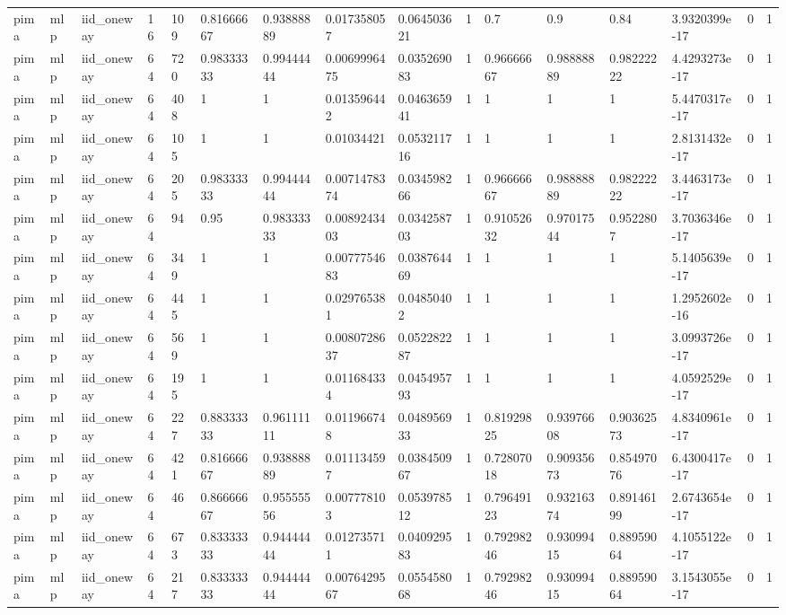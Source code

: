 \begin{tabular}{llllllllllllllll}
pima & mlp & iid\_oneway & 16 & 109 & 0.81666667 & 0.93888889 & 0.017358057 & 0.064503621 & 1 & 0.7 & 0.9 & 0.84 & 3.9320399e-17 & 0 & 1 \\
pima & mlp & iid\_oneway & 64 & 720 & 0.98333333 & 0.99444444 & 0.0069996475 & 0.035269083 & 1 & 0.96666667 & 0.98888889 & 0.98222222 & 4.4293273e-17 & 0 & 1 \\
pima & mlp & iid\_oneway & 64 & 408 & 1 & 1 & 0.013596442 & 0.046365941 & 1 & 1 & 1 & 1 & 5.4470317e-17 & 0 & 1 \\
pima & mlp & iid\_oneway & 64 & 105 & 1 & 1 & 0.01034421 & 0.053211716 & 1 & 1 & 1 & 1 & 2.8131432e-17 & 0 & 1 \\
pima & mlp & iid\_oneway & 64 & 205 & 0.98333333 & 0.99444444 & 0.0071478374 & 0.034598266 & 1 & 0.96666667 & 0.98888889 & 0.98222222 & 3.4463173e-17 & 0 & 1 \\
pima & mlp & iid\_oneway & 64 & 94 & 0.95 & 0.98333333 & 0.0089243403 & 0.034258703 & 1 & 0.91052632 & 0.97017544 & 0.9522807 & 3.7036346e-17 & 0 & 1 \\
pima & mlp & iid\_oneway & 64 & 349 & 1 & 1 & 0.0077754683 & 0.038764469 & 1 & 1 & 1 & 1 & 5.1405639e-17 & 0 & 1 \\
pima & mlp & iid\_oneway & 64 & 445 & 1 & 1 & 0.029765381 & 0.04850402 & 1 & 1 & 1 & 1 & 1.2952602e-16 & 0 & 1 \\
pima & mlp & iid\_oneway & 64 & 569 & 1 & 1 & 0.0080728637 & 0.052282287 & 1 & 1 & 1 & 1 & 3.0993726e-17 & 0 & 1 \\
pima & mlp & iid\_oneway & 64 & 195 & 1 & 1 & 0.011684334 & 0.045495793 & 1 & 1 & 1 & 1 & 4.0592529e-17 & 0 & 1 \\
pima & mlp & iid\_oneway & 64 & 227 & 0.88333333 & 0.96111111 & 0.011966748 & 0.048956933 & 1 & 0.81929825 & 0.93976608 & 0.90362573 & 4.8340961e-17 & 0 & 1 \\
pima & mlp & iid\_oneway & 64 & 421 & 0.81666667 & 0.93888889 & 0.011134597 & 0.038450967 & 1 & 0.72807018 & 0.90935673 & 0.85497076 & 6.4300417e-17 & 0 & 1 \\
pima & mlp & iid\_oneway & 64 & 46 & 0.86666667 & 0.95555556 & 0.007778103 & 0.053978512 & 1 & 0.79649123 & 0.93216374 & 0.89146199 & 2.6743654e-17 & 0 & 1 \\
pima & mlp & iid\_oneway & 64 & 673 & 0.83333333 & 0.94444444 & 0.012735711 & 0.040929583 & 1 & 0.79298246 & 0.93099415 & 0.88959064 & 4.1055122e-17 & 0 & 1 \\
pima & mlp & iid\_oneway & 64 & 217 & 0.83333333 & 0.94444444 & 0.0076429567 & 0.055458068 & 1 & 0.79298246 & 0.93099415 & 0.88959064 & 3.1543055e-17 & 0 & 1 \\

\end{tabular}
